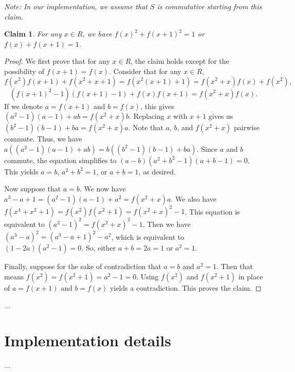 \documentclass{article}
\newtheorem*{claim}{Claim}
\begin{document}
\textit{Note: In our implementation, we assume that $S$ is commutative starting from this claim.}

\begin{claim}
For any $x \in R$, we have $f(x)^2 + f(x + 1)^2 = 1$ or $f(x) + f(x + 1) = 1$.
\end{claim}
\begin{proof}
We first prove that for any $x \in R$, the claim holds except for the possibility of $f(x + 1) = f(x)$.
Consider that for any $x \in R$,
\[ f(x^2) f(x + 1) + f(x^2 + x + 1) = f(x^2 (x + 1) + 1) = f(x^2 + x) f(x) + f(x^2), \]
\[ (f(x + 1)^2 - 1) (f(x + 1) - 1) + f(x) f(x + 1) = f(x^2 + x) f(x). \]
If we denote $a = f(x + 1)$ and $b = f(x)$, this gives $(a^2 - 1)(a - 1) + ab = f(x^2 + x) b$.
Replacing $x$ with $x + 1$ gives us $(b^2 - 1)(b - 1) + ba = f(x^2 + x) a$.
Note that $a$, $b$, and $f(x^2 + x)$ pairwise commute.
Thus, we have $a((a^2 - 1)(a - 1) + ab) = b((b^2 - 1)(b - 1) + ba)$.
Since $a$ and $b$ commute, the equation simplifies to $(a - b)(a^2 + b^2 - 1)(a + b - 1) = 0$.
This yields $a = b$, $a^2 + b^2 = 1$, or $a + b = 1$, as desired.

Now suppose that $a = b$.
We now have $a^3 - a + 1 = (a^2 - 1)(a - 1) + a^2 = f(x^2 + x) a$.
We also have $f(x^4 + x^2 + 1) = f(x^2) f(x^2 + 1) = f(x^2 + x)^2 - 1$.
This equation is equivalent to $(a^2 - 1)^2 = f(x^2 + x)^2 - 1$.
Then we have $(a^3 - a)^2 = (a^3 - a + 1)^2 - a^2$, which is equivalent to $(1 - 2a)(a^2 - 1) = 0$.
So, either $a + b = 2a = 1$ or $a^2 = 1$.

Finally, suppose for the sake of contradiction that $a = b$ and $a^2 = 1$.
Then that means $f(x^2) = f(x^2 + 1) = a^2 - 1 = 0$.
Using $f(x^2)$ and $f(x^2 + 1)$ in place of $a = f(x + 1)$ and $b = f(x)$ yields a contradiction.
This proves the claim.
\end{proof}

...





\section*{Implementation details}

...
\end{document}
